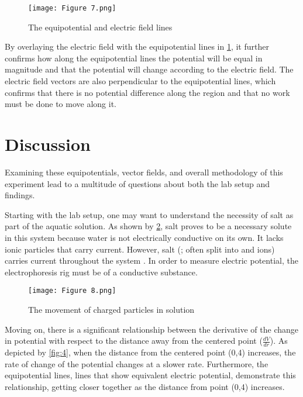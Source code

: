 \documentclass[10pt,journal,twoside]{IEEEtran}
\begin{document}
\begin{figure}
\begin{center}
\texttt{[image: Figure 7.png]}
\end{center}
\caption{The equipotential and electric field lines}
\label{fig:7}
\end{figure}
By overlaying the electric field with the equipotential lines in \cref{fig:7}, it further confirms how along the equipotential lines the potential will be equal in magnitude and that the potential will change according to the electric field. The electric field vectors are also perpendicular to the equipotential lines, which confirms that there is no potential difference along the region and that no work must be done to move along it. 






\section{Discussion}
Examining these equipotentials, vector fields, and overall methodology of this experiment lead to a multitude of questions about both the lab setup and findings. 

Starting with the lab setup, one may want to understand the necessity of salt as part of the aquatic solution. As shown by \cref{fig:8}, salt proves to be a necessary solute in this system because water is not electrically conductive on its own. It lacks ionic particles that carry current. However, salt (; often split into  and  ions) carries current throughout the system \cite{campbell}. In order to measure electric potential, the electrophoresis rig must be of a conductive substance. 
\begin{figure}
\begin{center}
\texttt{[image: Figure 8.png]}
\end{center}
\caption{The movement of charged  particles in solution}
\label{fig:8}
\end{figure}

Moving on, there is a significant relationship between the derivative of the change in potential with respect to the distance away from the centered point ($\frac{dV}{dr}$). As depicted by \cref{fig:4}, when the distance from the centered point (0,4) increases, the rate of change of the potential changes at a slower rate. Furthermore, the equipotential lines, lines that show equivalent electric potential, demonstrate this relationship, getting closer together as the distance from point (0,4) increases.
\end{document}
